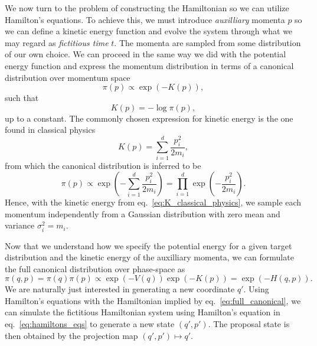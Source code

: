 We now turn to the problem of constructing the Hamiltonian so we can utilize Hamilton's equations.
To achieve this, we must introduce \textit{auxilliary} momenta $p$ so we can define a kinetic energy function
and evolve the system through what we may regard as \textit{fictitious time} $t$. 
The momenta are sampled from some distribution of our own choice. We can proceed in the same way we did
with the potential energy function and express the momentum distribution in terms of a canonical distribution
over momentum space
\begin{equation}
  \pi(p) \propto \exp\left(-K(p)\right),
\end{equation}
such that
\begin{equation}
  K(p) = -\log \pi (p),
\end{equation}
up to a constant. The commonly chosen expression for kinetic energy is 
the one found in classical physics
\begin{equation}\label{eq:K_classical_physics}
  K(p) = \sum_{i=1}^d \frac{p_i^2}{2m_i},
\end{equation}
from which the canonical distribution is inferred to be
\begin{equation}\label{eq:canonical_p}
  \pi(p) \propto \exp\left(-\sum_{i=1}^d \frac{p_i^2}{2m_i}\right) = \prod_{i=1}^d \exp\left(-\frac{p_i^2}{2m_i}\right).
\end{equation}
Hence, with the kinetic energy from eq.~\eqref{eq:K_classical_physics}, we 
sample each momentum independently from a Gaussian distribution with zero mean and variance $\sigma_i^2 = m_i$.

Now that we understand how we specify the potential energy for a given target distribution and
the kinetic energy of the auxilliary momenta, we can formulate the full canonical distribution over phase-space as
\begin{equation}\label{eq:full_canonical}
  \pi(q, p) = \pi(q)\pi(p) \propto \exp\left(-V(q)\right)\exp\left(-K(p)\right) = \exp\left(-H(q, p)\right).
\end{equation}
We are naturally just interested in generating a new coordinate $q'$. Using Hamilton's equations
with the Hamiltonian implied by eq.~\eqref{eq:full_canonical}, we can simulate the fictitious Hamiltonian
system using Hamilton's equation in eq.~\eqref{eq:hamiltons_eqs} to generate a new state $(q', p')$. The proposal state
is then obtained by the projection map $(q', p') \mapsto q'$.

